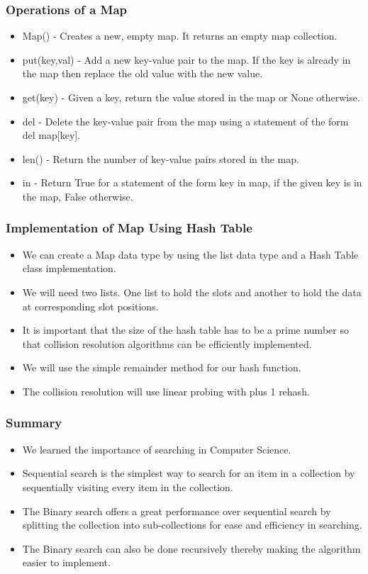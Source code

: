 \documentclass{beamer}
\begin{document}
\begin{frame}
\frametitle{Operations of a Map}
\begin{itemize}
\item Map() - Creates a new, empty map. It returns an empty map collection.
\item put(key,val) - Add a new key-value pair to the map. If the key is already in the map
then replace the old value with the new value.
\item get(key) - Given a key, return the value stored in the map or None otherwise.
\item del - Delete the key-value pair from the map using a statement of the form del map[key].
\item len() - Return the number of key-value pairs stored in the map.
\item in - Return True for a statement of the form key in map, if the given key is in the map, False otherwise.
\end{itemize}
\end{frame}

\begin{frame}
\frametitle{Implementation of Map Using Hash Table}
\begin{itemize}
\item We can create a Map data type by using the list data type and a Hash Table class implementation. 
\item We will need two lists. One list to hold the slots and another to hold the data at corresponding slot positions. 
\item It is important that the size of the hash table has to be a prime number so that collision resolution algorithms can be efficiently implemented.
\item We will use the simple remainder method for our hash function.
\item The collision resolution will use linear probing with plus 1 rehash.
\end{itemize}
\end{frame}

\begin{frame}
\frametitle{Summary}
\begin{itemize}
\item We learned the importance of searching in Computer Science.
\item Sequential search is the simplest way to search for an item in a collection by sequentially visiting every item in the collection.
\item The Binary search offers a great performance over sequential search by splitting the collection into sub-collections for ease and efficiency in searching.
\item The Binary search can also be done recursively thereby making the algorithm easier to implement.
\end{itemize}
\end{frame}
\end{document}

